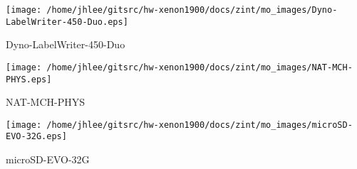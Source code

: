 \noindent
\vspace{1.4cm}
\begin{minipage}{.2\textwidth}
\begin{center}
\texttt{[image: /home/jhlee/gitsrc/hw-xenon1900/docs/zint/mo\_images/Dyno-LabelWriter-450-Duo.eps]}
\end{center}
\end{minipage}
\begin{minipage}{.7\textwidth}
Dyno-LabelWriter-450-Duo
\end{minipage}


\noindent
\vspace{1.4cm}
\begin{minipage}{.2\textwidth}
\begin{center}
\texttt{[image: /home/jhlee/gitsrc/hw-xenon1900/docs/zint/mo\_images/NAT-MCH-PHYS.eps]}
\end{center}
\end{minipage}
\begin{minipage}{.7\textwidth}
NAT-MCH-PHYS
\end{minipage}


\noindent
\vspace{1.4cm}
\begin{minipage}{.2\textwidth}
\begin{center}
\texttt{[image: /home/jhlee/gitsrc/hw-xenon1900/docs/zint/mo\_images/microSD-EVO-32G.eps]}
\end{center}
\end{minipage}
\begin{minipage}{.7\textwidth}
microSD-EVO-32G
\end{minipage}


